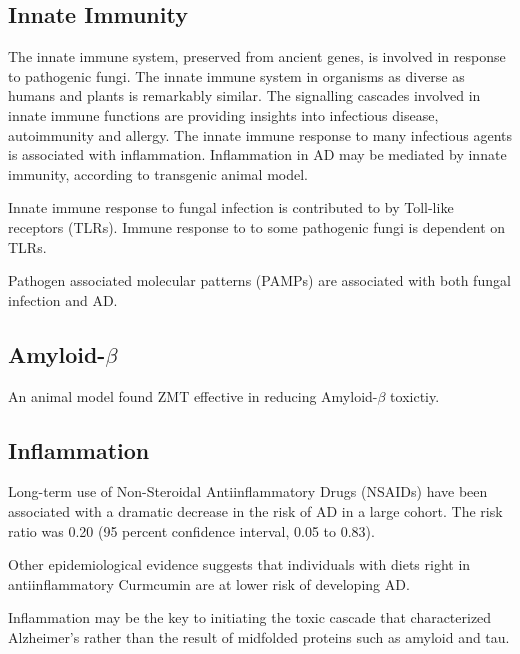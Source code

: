 \documentclass[twocolumn]{article}
\begin{document}
\subsection{Innate Immunity}
The innate immune system, preserved from ancient genes,
is involved in response to pathogenic fungi.
\cite{means2009evolutionarily}
The innate immune system in organisms as diverse as humans and plants
is remarkably similar.
\cite{nurnberger2002innate, nurnberger2004innate}
The signalling cascades involved in innate immune functions
are providing insights into infectious disease, autoimmunity and allergy.
The innate immune response to many infectious agents is associated with
inflammation.
\cite{akira2006pathogen}
Inflammation in AD may be mediated by innate immunity,
according to transgenic animal model.
\cite{fassbender2004lps}

Innate immune response to fungal infection is
contributed to by Toll-like receptors (TLRs).
\cite{bellocchio2004contribution}
Immune response to to some pathogenic fungi is dependent
on TLRs.
\cite{
viriyakosol2005innate,
roeder2004toll
}


Pathogen associated molecular patterns (PAMPs) are
associated with both fungal infection
\cite{kumar2011pathogen}
and AD.
\cite{salminen2009inflammation}






\subsection{Amyloid-$\beta$}


An animal model found ZMT effective in reducing Amyloid-$\beta$
toxictiy.
\cite{tohda2003repair}


\subsection{Inflammation}


Long-term use of Non-Steroidal Antiinflammatory Drugs (NSAIDs)
have been associated with a dramatic decrease in the risk of AD
in a large cohort.
The risk ratio was 0.20 (95 percent confidence interval, 0.05 to 0.83).
\cite{in2001nonsteroidal}

Other epidemiological evidence suggests that individuals
with diets right in antiinflammatory Curmcumin
are at lower risk of developing AD.
\cite{?}


Inflammation may be the key to initiating the toxic cascade that
characterized Alzheimer's rather than the result of
midfolded proteins such as amyloid and tau.
\cite{heneka2007inflammatory}
\end{document}
